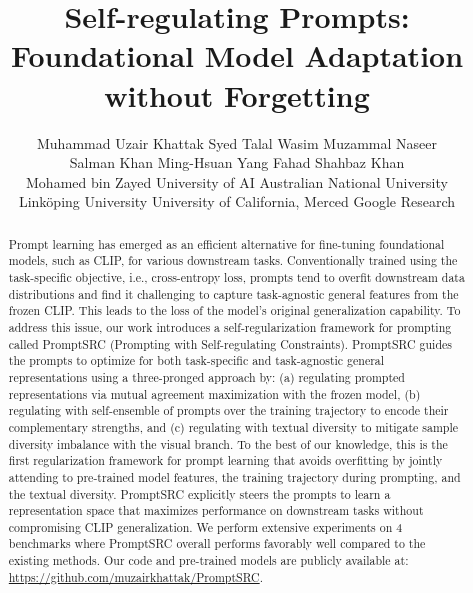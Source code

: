 \documentclass[10pt,twocolumn,letterpaper]{article}
\newcommand{\corrAuthor}{}
\begin{document}
\title{Self-regulating Prompts: Foundational Model Adaptation without Forgetting}

\author{Muhammad Uzair Khattak\corrAuthor \quad 
  Syed Talal Wasim \quad 
  Muzammal Naseer \\ 
  Salman Khan \quad
  Ming-Hsuan Yang \quad
  Fahad Shahbaz Khan
  \vspace{0.5em} \\
  Mohamed bin Zayed University of AI \quad 
  Australian National University \\ 
  Link\"{o}ping University \quad 
  University of California, Merced \quad 
  Google Research
}


\maketitle
\ificcvfinal\thispagestyle{empty}\fi

\begin{abstract}
Prompt learning has emerged as an efficient alternative for fine-tuning foundational models, such as CLIP, for various downstream tasks. Conventionally trained using the task-specific objective, i.e., cross-entropy loss, prompts tend to overfit downstream data distributions and find it challenging to capture task-agnostic general features from the frozen CLIP. This leads to the loss of the model's original generalization capability. To address this issue, our work introduces a self-regularization framework for prompting called PromptSRC (Prompting with Self-regulating Constraints). PromptSRC guides the prompts to optimize for both task-specific and task-agnostic general representations using a three-pronged approach by: (a) regulating {prompted} representations via mutual agreement maximization with the frozen model, (b) regulating with self-ensemble of prompts over the training trajectory to encode their complementary strengths, and (c) regulating with textual diversity to mitigate sample diversity imbalance with the visual branch. To the best of our knowledge, this is the first regularization framework for prompt learning that avoids overfitting by jointly attending to pre-trained model features, the training trajectory during prompting, and the textual diversity. PromptSRC explicitly steers the prompts to learn a representation space that maximizes performance on downstream tasks without compromising CLIP generalization. We perform extensive experiments on 4 benchmarks where PromptSRC  {overall} performs favorably well compared to the existing methods. Our code and pre-trained models are publicly available at: \href{https://github.com/muzairkhattak/PromptSRC}{https://github.com/muzairkhattak/PromptSRC}.
\end{abstract}\vspace{-1em}
\end{document}
